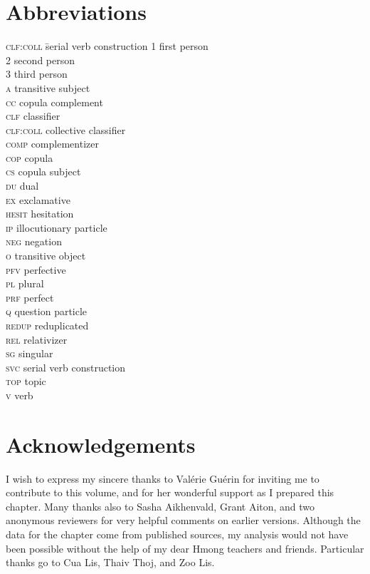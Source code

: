 \documentclass[output=paper]{LSP/langsci}
\begin{document}
\section*{Abbreviations}
\begin{multicols}{2}
\begin{tabbing}
\textsc{clf:coll} \= serial verb construction\kill
\textsc{1} \> first person\\
\textsc{2} \> second person\\
\textsc{3}  \> third person\\
\textsc{a} \> transitive subject\\
\textsc{cc} \> copula complement\\
\textsc{clf} \> classifier\\
\textsc{clf:coll} \> collective classifier\\
\textsc{comp} \> complementizer\\
\textsc{cop} \> copula\\
\textsc{cs} \> copula subject\\
\textsc{du} \> dual\\
\textsc{ex} \> exclamative\\
\textsc{hesit} \> hesitation\\
\textsc{ip} \> illocutionary particle\\
\textsc{neg} \> negation\\
\textsc{o} \> transitive object\\
\textsc{pfv} \> perfective\\
\textsc{pl} \> plural\\
\textsc{prf} \> perfect\\
\textsc{q} \> question particle\\
\textsc{redup} \> reduplicated\\
\textsc{rel} \> relativizer\\
\textsc{sg} \> singular\\
\textsc{svc} \> serial verb construction\\
\textsc{top} \> topic\\
\textsc{v} \> verb
\end{tabbing}
\end{multicols}

\section*{Acknowledgements}
I wish to express my sincere thanks to Valérie Guérin for inviting me to contribute to
this volume, and for her wonderful support as I prepared this chapter. Many thanks
also to Sasha Aikhenvald, Grant Aiton, and two anonymous reviewers for very helpful
comments on earlier versions. Although the data for the chapter come from published
sources, my analysis would not have been possible without the help of my dear Hmong
teachers and friends. Particular thanks go to Cua Lis, Thaiv Thoj, and Zoo Lis.

\sloppy

\printbibliography[heading=subbibliography,notkeyword=this] 
\end{document}
